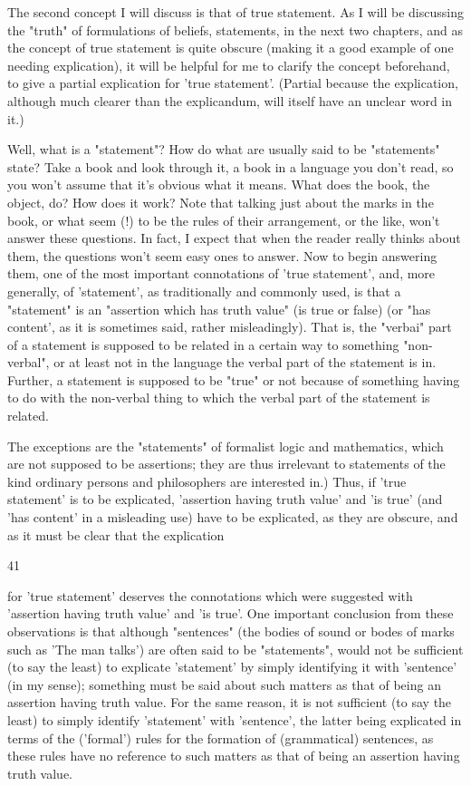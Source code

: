 \documentclass[10pt,twoside]{memoir}
\begin{document}
\begin{enumerate}
{{{{{{The second concept I will discuss is that of true statement. As I will be 
discussing the "truth" of formulations of beliefs, statements, in the next two 
chapters, and as the concept of true statement is quite obscure (making it a 
good example of one needing explication), it will be helpful for me to clarify 
the concept beforehand, to give a partial explication for 'true statement'. 
(Partial because the explication, although much clearer than the 
explicandum, will itself have an unclear word in it.) 

Well, what is a "statement"? How do what are usually said to be 
"statements" state? Take a book and look through it, a book in a language 
you don't read, so you won't assume that it's obvious what it means. What 
does the book, the object, do? How does it work? Note that talking just 
about the marks in the book, or what seem (!) to be the rules of their 
arrangement, or the like, won't answer these questions. In fact, I expect that 
when the reader really thinks about them, the questions won't seem easy 
ones to answer. Now to begin answering them, one of the most important 
connotations of 'true statement', and, more generally, of 'statement', as 
traditionally and commonly used, is that a "statement" is an "assertion 
which has truth value" (is true or false) (or "has content', as it is sometimes 
said, rather misleadingly). That is, the "verbai" part of a statement is 
supposed to be related in a certain way to something "non-verbal", or at 
least not in the language the verbal part of the statement is in. Further, a 
statement is supposed to be "true" or not because of something having to do 
with the non-verbal thing to which the verbal part of the statement is 
related. {The exceptions are the "statements" of formalist logic and 
mathematics, which are not supposed to be assertions; they are thus 
irrelevant to statements of the kind ordinary persons and philosophers are 
interested in.) Thus, if 'true statement' is to be explicated, 'assertion having 
truth value' and 'is true' (and 'has content' in a misleading use) have to be 
explicated, as they are obscure, and as it must be clear that the explication 


41 


for 'true statement' deserves the connotations which were suggested with 
'assertion having truth value' and 'is true'. One important conclusion from 
these observations is that although "sentences" (the bodies of sound or 
bodes of marks such as 'The man talks') are often said to be "statements", 
would not be sufficient (to say the least) to explicate 'statement' by simply 
identifying it with 'sentence' (in my sense); something must be said about 
such matters as that of being an assertion having truth value. For the same 
reason, it is not sufficient (to say the least) to simply identify 'statement' 
with 'sentence', the latter being explicated in terms of the ('formal') rules 
for the formation of (grammatical) sentences, as these rules have no 
reference to such matters as that of being an assertion having truth value. 

}}}}}}}
\end{enumerate}
\end{document}
